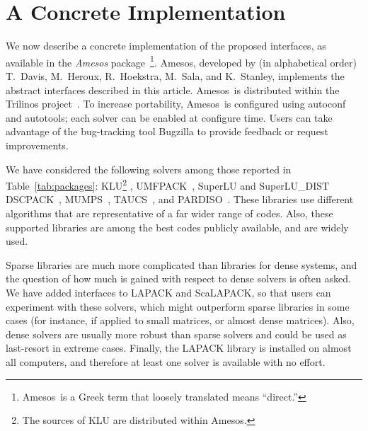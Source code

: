 \documentclass[acmtocl]{acmtrans2m}
\newcommand{\amesos}{{\sc Amesos}}
\begin{document}
\section{A Concrete Implementation}
\label{sec:concrete}

We now describe a concrete implementation of the proposed interfaces, as
available in the {\sl \amesos} package~\cite{Amesos-Reference-Guide}\footnote{
\amesos\ is a Greek term that loosely translated means ``direct.''}.
\amesos,
developed by (in alphabetical order) T.~Davis, M.~Heroux, R.~Hoekstra, 
M.~Sala, and K.~Stanley, implements the abstract interfaces described in this
article. \amesos\ is distributed within the
Trilinos project~\cite{heroux05trilinos}.
To increase portability,
\amesos\ is
configured using autoconf and autotools; each solver can be enabled at
configure time. Users can take advantage of the bug-tracking tool Bugzilla to
provide feedback or request improvements.

We have considered the following solvers among those
reported in Table~\ref{tab:packages}: KLU\footnote{The sources of KLU are
  distributed within \amesos.} \cite{davis05klu}, 
  UMFPACK~\cite{umfpack-home-page}, SuperLU and
  SuperLU\_DIST~\cite{superlu-manual}
  DSCPACK~\cite{dscpack-manual}, 
  MUMPS~\cite{mumps-manual}, 
  TAUCS~\cite{irony04parallel,rotkin04design,rozin04locality}, 
  and PARDISO~\cite{oskl:04-etna,sg:04-fgcs}.
These libraries use different algorithms that are
representative of a far wider range of codes. Also, these supported libraries are
among the best codes publicly available, and are widely used.  

Sparse libraries are much more complicated than libraries for dense systems,
  and the question of how much is gained with respect to dense solvers 
  is often asked. We have added
  interfaces to LAPACK and ScaLAPACK, so that users can experiment with these
  solvers, which might outperform  sparse libraries in some cases 
  (for instance, if applied to small matrices, or almost dense matrices). Also, dense
  solvers are usually more robust than sparse solvers and could be used as
  last-resort in extreme cases. Finally, the LAPACK library is installed on
  almost all computers, and therefore at least one solver is available with no
  effort.
\end{document}
